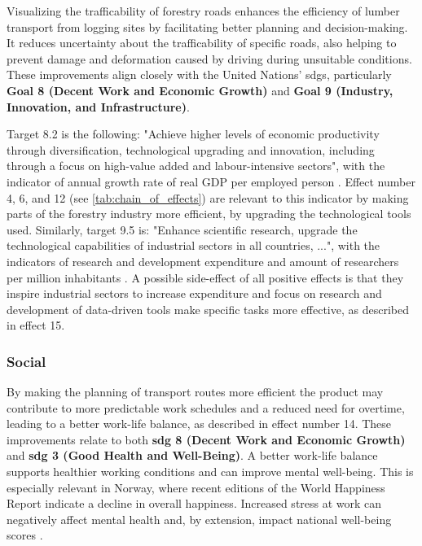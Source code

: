 Visualizing the trafficability of forestry roads enhances the efficiency of lumber transport from logging sites by facilitating better planning and decision-making. It reduces uncertainty about the trafficability of specific roads, also helping to prevent damage and deformation caused by driving during unsuitable conditions. These improvements align closely with the United Nations' \acrshort{sdg}s, particularly \textbf{Goal 8 (Decent Work and Economic Growth)} and \textbf{Goal 9 (Industry, Innovation, and Infrastructure)}. 

Target 8.2 is the following: "Achieve higher levels of economic productivity through diversification, technological upgrading and innovation, including through a focus on high-value added and labour-intensive sectors", with the indicator of annual growth rate of real GDP per employed person \cite{sdgsgoals}. Effect number 4, 6, and 12 (see \autoref{tab:chain_of_effects}) are relevant to this indicator by making parts of the forestry industry more efficient, by upgrading the technological tools used. Similarly, target 9.5 is: "Enhance scientific research, upgrade the technological capabilities of industrial sectors in all countries, ...", with the indicators of research and development expenditure and amount of researchers per million inhabitants \cite{sdgsgoals}. A possible side-effect of all positive effects is that they inspire industrial sectors to increase expenditure and focus on research and development of data-driven tools make specific tasks more effective, as described in effect 15.

\subsubsection{Social}

By making the planning of transport routes more efficient the product may contribute to more predictable work schedules and a reduced need for overtime, leading to a better work-life balance, as described in effect number 14. These improvements relate to both \textbf{\acrshort{sdg} 8 (Decent Work and Economic Growth)} and \textbf{\acrshort{sdg} 3 (Good Health and Well-Being)}. A better work-life balance supports healthier working conditions and can improve mental well-being. This is especially relevant in Norway, where recent editions of the World Happiness Report indicate a decline in overall happiness. Increased stress at work can negatively affect mental health and, by extension, impact national well-being scores \cite{sdg3no}.

